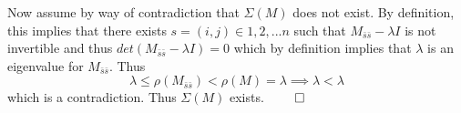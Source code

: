 \documentclass[11pt]{article}
\begin{document}
Now assume by way of contradiction that $\Sigma (M)$ does not exist. By definition, this implies that there exists $s = (i,j) \in {1, 2, ... n}$ such that $M_{\bar{s}\bar{s}}-\lambda I$ is not invertible and thus $det(M_{\bar{s}\bar{s}}-\lambda I) = 0$ which by definition implies that $\lambda$ is an eigenvalue for $M_{\bar{s}\bar{s}}$. Thus $$\lambda \leq \rho (M_{\bar{s}\bar{s}}) < \rho (M) = \lambda \implies \lambda < \lambda$$ which is a contradiction. Thus $\Sigma (M)$ exists. $\qed$

 
\end{document}

